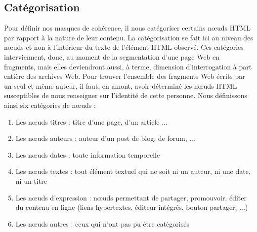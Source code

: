 \documentclass[symmetric,justified,marginals=raggedouter]{tufte-book}
\begin{document}
\begin{algorithm} 
\end{algorithm}

\subsection{Catégorisation}

\noindent Pour définir nos masques de cohérence, il nous catégoriser certains nœuds HTML par rapport à la nature de leur contenu. La catégorisation se fait ici au niveau des nœuds et non à l'intérieur du texte de l'élément HTML observé. Ces catégories interviennent, donc, au moment de la segmentation d'une page Web en fragments, mais elles deviendront aussi, à terme, dimension d'interrogation à part entière des archives Web. Pour trouver l'ensemble des fragments Web écrits par un seul et même auteur, il faut, en amont, avoir déterminé les nœuds HTML susceptibles de nous renseigner sur l'identité de cette personne. Nous définissons ainsi six catégories de nœuds :

\begin{enumerate}[leftmargin=*]  
\item Les nœuds titres : titre d'une page, d'un article ...
\item Les nœuds auteurs : auteur d'un post de blog, de forum, ...
\item Les nœuds dates : toute information temporelle 
\item Les nœuds textes : tout élément textuel qui ne soit ni un auteur, ni une date, ni un titre
\item Les nœuds d'expression : nœuds permettant de partager, promouvoir, éditer du contenu en ligne (liens hypertextes, éditeur intégrés, bouton partager, ...)
\item Les nœuds autres : ceux qui n'ont pas pu être catégorisés 
\end{enumerate}
\end{document}
